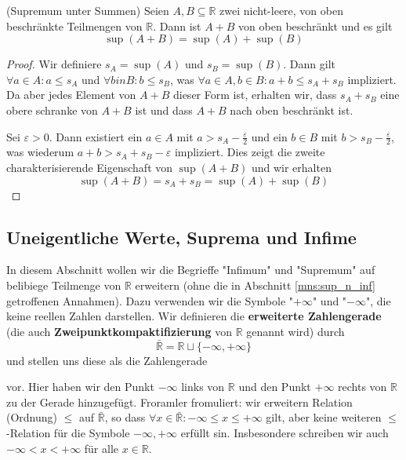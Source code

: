 \documentclass[../Analysis1_script.tex]{subfiles}
\begin{document}
\begin{proposition}{(Supremum unter Summen)}
	Seien $A,B\subseteq \mathbb {R}$ zwei nicht-leere, von oben beschränkte Teilmengen von $\mathbb {R}$. Dann ist $A+B$ von oben beschränkt und es gilt 
	\[\sup(A+B) = \sup(A) + \sup(B)\]
\end{proposition}

\begin{proof}
	Wir definiere $s_A = \sup(A)$ und $s_B = \sup(B)$. Dann gilt $\forall a \in A: a \leq s_A$ und $\forall b in B: b \leq s_B$, was $\forall a \in A, b \in B: a + b \leq s_A + s_B$ impliziert. Da aber jedes Element von $A + B$ dieser Form ist, erhalten wir, dass $s_A + s_B$ eine obere schranke von $A + B$ ist und dass $A + B$ nach oben beschränkt ist.
	
	Sei $\varepsilon >0$. Dann existiert ein $a\in A$ mit $a > s_A - \frac {\varepsilon }{2}$ und ein $b\in B$ mit $b > s_B - \frac {\varepsilon }{2}$, was wiederum $a+b > s_A+s_B-\varepsilon$ impliziert. Dies zeigt die zweite charakterisierende Eigenschaft von $\sup (A+B)$ und wir erhalten 
	\[\sup(A + B) = s_A + s_B = \sup(A) + \sup(B)\]
\end{proof}


\subsection{Uneigentliche Werte, Suprema und Infime}

In diesem Abschnitt wollen wir die Begrieffe "Infimum" und "Supremum" auf belibiege Teilmenge von $\mathbb{R}$ erweitern (ohne die in Abschnitt \ref{mns:sup_n_inf} getroffenen Annahmen). Dazu verwenden wir die Symbole "$+\infty$" und "$-\infty$", die keine reellen Zahlen darstellen. Wir definieren die \textbf{erweiterte Zahlengerade} (die auch \textbf{Zweipunktkompaktifizierung} von $\mathbb{R}$ genannt wird) durch 
\[\bar{\mathbb{R}} = \mathbb{R} \sqcup \{-\infty, +\infty\} \]
und stellen uns diese als die Zahlengerade

\def\svgwidth{\columnwidth}

vor. Hier haben wir den Punkt $-\infty$ links von $\mathbb{R}$ und den Punkt $+\infty$ rechts von $\mathbb{R}$ zu der Gerade hinzugefügt. Froramler fromuliert: wir erweitern Relation (Ordnung) $\leq$ auf $\bar{\mathbb{R}}$, so dass $\forall x \in \bar{\mathbb{R}}: -\infty \leq x \leq +\infty$ gilt, aber keine weiteren $\leq$-Relation für die Symbole $-\infty, +\infty$ erfüllt sin. Insbesondere schreiben wir auch $-\infty < x < +\infty$ für alle $x \in \mathbb{R}$.
\end{document}
